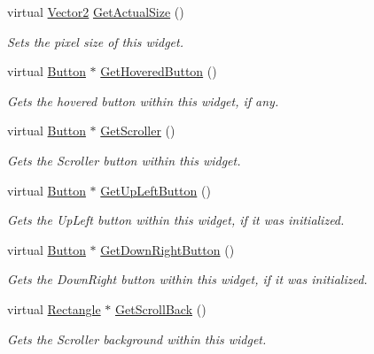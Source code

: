 \begin{DoxyCompactItemize}
virtual \hyperlink{classphys_1_1Vector2}{Vector2} \hyperlink{classphys_1_1UI_1_1Scrollbar_a2b3d791cbbe4c787f284d8b12a0edf27}{GetActualSize} ()
\begin{DoxyCompactList}\small\item\em Sets the pixel size of this widget. \item\end{DoxyCompactList}\item 
virtual \hyperlink{classphys_1_1UI_1_1Button}{Button} $\ast$ \hyperlink{classphys_1_1UI_1_1Scrollbar_a0f0d8f4f985198a6bdb8007065fb8663}{GetHoveredButton} ()
\begin{DoxyCompactList}\small\item\em Gets the hovered button within this widget, if any. \item\end{DoxyCompactList}\item 
virtual \hyperlink{classphys_1_1UI_1_1Button}{Button} $\ast$ \hyperlink{classphys_1_1UI_1_1Scrollbar_a28024d2f3a017e4ed3c2a4df62a1e8be}{GetScroller} ()
\begin{DoxyCompactList}\small\item\em Gets the Scroller button within this widget. \item\end{DoxyCompactList}\item 
virtual \hyperlink{classphys_1_1UI_1_1Button}{Button} $\ast$ \hyperlink{classphys_1_1UI_1_1Scrollbar_ab298f9747da2eed451ddce8b1a416c15}{GetUpLeftButton} ()
\begin{DoxyCompactList}\small\item\em Gets the UpLeft button within this widget, if it was initialized. \item\end{DoxyCompactList}\item 
virtual \hyperlink{classphys_1_1UI_1_1Button}{Button} $\ast$ \hyperlink{classphys_1_1UI_1_1Scrollbar_abf733d00087050d575fca1abc2d4ba0e}{GetDownRightButton} ()
\begin{DoxyCompactList}\small\item\em Gets the DownRight button within this widget, if it was initialized. \item\end{DoxyCompactList}\item 
virtual \hyperlink{classphys_1_1UI_1_1Rectangle}{Rectangle} $\ast$ \hyperlink{classphys_1_1UI_1_1Scrollbar_a1c24fbb88f9d86aff1b2f0abc033116a}{GetScrollBack} ()
\begin{DoxyCompactList}\small\item\em Gets the Scroller background within this widget. \item\end{DoxyCompactList}\end{DoxyCompactItemize}
